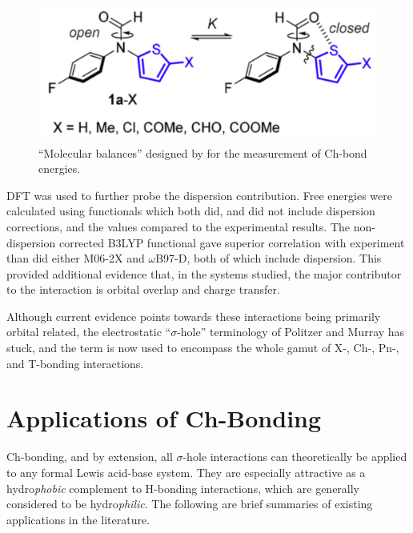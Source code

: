 \begin{refsection}
\begin{figure}
    \centering
    \includegraphics[width=0.6\linewidth]{Figures/cockroft-balances.pdf}
    \caption[``Molecular balances'' for the measurement of Ch-bond energies.]{``Molecular balances'' designed by \citeauthor{Pascoe2017} for the measurement of Ch-bond energies.\autocite{Pascoe2017}}\label{fig:cockroft-balances}
\end{figure}

DFT was used to further probe the dispersion contribution.
Free energies were calculated using functionals which both did, and did not include dispersion corrections, and the values compared to the experimental results.
The non-dispersion corrected B3LYP functional gave superior correlation with experiment than did either M06-2X and $ \omega $B97-D, both of which include dispersion.
This provided additional evidence that, in the systems studied, the major contributor to the interaction is orbital overlap and charge transfer.

Although current evidence points towards these interactions being primarily orbital related, the electrostatic ``$ \sigma $-hole'' terminology of Politzer and Murray has stuck, and the term is now used to encompass the whole gamut of X-, Ch-, Pn-, and T-bonding interactions.

\section{Applications of Ch-Bonding}
Ch-bonding, and by extension, all $ \sigma $-hole interactions can theoretically be applied to any formal Lewis acid-base system.
They are especially attractive as a hydro\emph{phobic} complement to H-bonding interactions, which are generally considered to be hydro\emph{philic}.
The following are brief summaries of existing applications in the literature.


\end{refsection}
